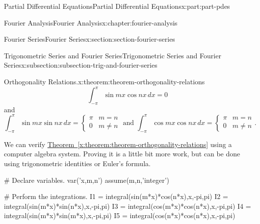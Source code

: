 \documentclass[oneside,10pt,]{book}
\newcommand{\xreffont}{\relax}
\numberwithin{equation}{part}
\newcommand{\amp}{&}
\begin{document}
\begin{partptx}{Partial Differential Equations}{}{Partial Differential Equations}{}{}{x:part:part-pdes}
\begin{chapterptx}{Fourier Analysis}{}{Fourier Analysis}{}{}{x:chapter:fourier-analysis}
\begin{sectionptx}{Fourier Series}{}{Fourier Series}{}{}{x:section:section-fourier-series}
\begin{subsectionptx}{Trigonometric Series and Fourier Series}{}{Trigonometric Series and Fourier Series}{}{}{x:subsection:subsection-trig-and-fourier-series}
\begin{theorem}{Orthogonality Relations.}{}{x:theorem:theorem-orthogonality-relations}
\begin{equation*}
\int_{-\pi}^{\pi}\sin mx\cos nx\,dx = 0
\end{equation*}
and%
\begin{equation*}
\int_{-\pi}^{\pi}\sin mx\sin nx\,dx = \begin{cases} \pi \amp m=n \\ 0 \amp m\neq n\end{cases}\text{ and }\int_{-\pi}^{\pi}\cos mx\cos nx\,dx = \begin{cases} \pi \amp m=n \\ 0 \amp m\neq n\end{cases}\text{.}
\end{equation*}
%
\end{theorem}
We can verify \hyperref[x:theorem:theorem-orthogonality-relations]{Theorem~{\xreffont\ref{x:theorem:theorem-orthogonality-relations}}} using a computer algebra system. Proving it is a little bit more work, but can be done using trigonometric identities or Euler's formula.%
\begin{sageinput}
# Declare variables.
var('x,m,n')
assume(m,n,'integer')

# Perform the integrations.
I1 = integral(sin(m*x)*cos(n*x),x,-pi,pi)
I2 = integral(sin(m*x)*sin(n*x),x,-pi,pi)
I3 = integral(cos(m*x)*cos(n*x),x,-pi,pi)
I4 = integral(sin(m*x)*sin(m*x),x,-pi,pi)
I5 = integral(cos(n*x)*cos(n*x),x,-pi,pi)


\end{sageinput}
\end{subsectionptx}
\end{sectionptx}
\end{chapterptx}
\end{partptx}
\end{document}
